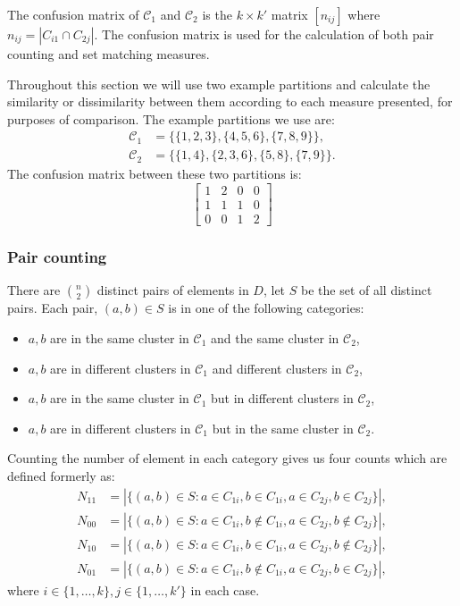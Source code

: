 \documentclass[a4paper]{report}
\newcommand{\dset}{D}
\newcommand{\clus}{\mathcal{C}}
\begin{document}
The confusion matrix of $\clus_1$ and $\clus_2$ is the $k \times k'$ matrix
$[n_{ij}]$ where $n_{ij} = |C_{i1} \cap C_{2j}|$.  The confusion matrix is
used for the calculation of both pair counting and set matching measures.

Throughout this section we will use two example partitions and calculate the
similarity or dissimilarity between them according to each measure presented,
for purposes of comparison.  The example partitions we use are:
\begin{align*}
  \clus_1 &= \{\{1,2,3\},\{4,5,6\},\{7,8,9\}\}, \\
  \clus_2 &= \{\{1,4\},\{2,3,6\},\{5,8\},\{7,9\}\}.
\end{align*}
The confusion matrix between these two partitions is:
\begin{equation*}
  \left[
  \begin{matrix}
    1 & 2 & 0 & 0 \\
    1 & 1 & 1 & 0 \\
    0 & 0 & 1 & 2
  \end{matrix}
  \right]
\end{equation*}

\subsubsection{Pair counting}
\label{sec:pair-counting}

There are $\binom{n}{2}$ distinct pairs of elements in $\dset$, let $S$ be the
set of all distinct pairs.  Each pair, $(a,b) \in S$ is in one of the
following categories:
\begin{itemize}
\item $a,b$ are in the same cluster in $\clus_1$ and the same cluster in
  $\clus_2$,
\item $a,b$ are in different clusters in $\clus_1$ and different clusters in
  $\clus_2$,
\item $a,b$ are in the same cluster in $\clus_1$ but in different clusters in
  $\clus_2$,
\item $a,b$ are in different clusters in $\clus_1$ but in the same cluster in
  $\clus_2$.
\end{itemize}

Counting the number of element in each category gives us four counts which are
defined formerly as:
\begin{align*}
  N_{11} &= |\{(a,b) \in S \colon
              a \in C_{1i},b \in C_{1i},a \in C_{2j},b \in C_{2j}
            \}|, \\
  N_{00} &= |\{(a,b) \in S \colon
              a \in C_{1i},b \notin C_{1i},a \in C_{2j},b \notin C_{2j}
            \}|, \\
  N_{10} &= |\{(a,b) \in S \colon
              a \in C_{1i},b \in C_{1i},a \in C_{2j},b \notin C_{2j}
            \}|, \\
  N_{01} &= |\{(a,b) \in S \colon
              a \in C_{1i},b \notin C_{1i},a \in C_{2j},b \in C_{2j}
            \}|,
\end{align*}
where $i \in \{1,\dotsc,k\}, j \in \{1,\dotsc,k'\}$ in each case.
\end{document}
